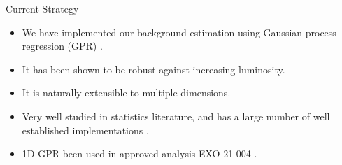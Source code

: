 \documentclass[10pt]{beamer}
\begin{document}

\begin{frame}{Current Strategy}
  \begin{itemize}
  \item We have implemented our background estimation using Gaussian process regression (GPR) \cite{rasmussen_gaussian_2006}.
  \item It has been shown to be robust against increasing luminosity\cite{frate_modeling_2017}.
  \item It is naturally extensible to multiple dimensions.
  \item Very well studied in statistics literature\cite{rasmussen_gaussian_2006}, and has a large number of well established implementations \cite{noauthor_comparison_2024, gardner_gpytorch_2021}.
  \item 1D GPR been used in approved analysis EXO-21-004 \cite{cms_collaboration_searches_2024}.
  \end{itemize}
\end{frame}
\end{document}
